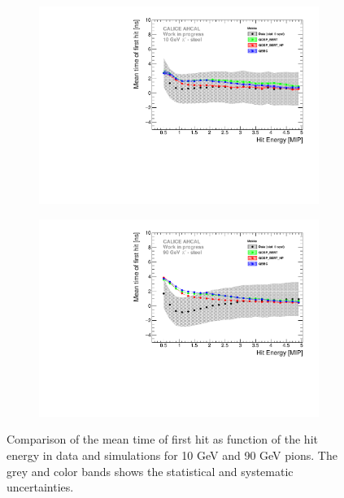 \documentclass{JINST}
\begin{document}
\begin{figure}[htbp!]
	\centering
	\begin{subfigure}[t]{0.49\textwidth}
		\includegraphics[width=1\textwidth]{fig/Time_Energy_10GeV_Mokka.pdf}
		\caption{}\label{fig:Energy_SimData_10GeV}
	\end{subfigure}
	\hfill
	\begin{subfigure}[t]{0.49\textwidth}
		\includegraphics[width=1\textwidth]{fig/Time_Energy_90GeV_Mokka.pdf}
		\caption{}\label{fig:Energy_SimData_90GeV}
	\end{subfigure}
	\caption{Comparison of the mean time of first hit as function of the hit energy in data and simulations for 10 GeV and 90 GeV pions. The grey and color bands shows the statistical and systematic uncertainties.}
	\label{fig:Energy_SimData}
\end{figure}
\end{document}
